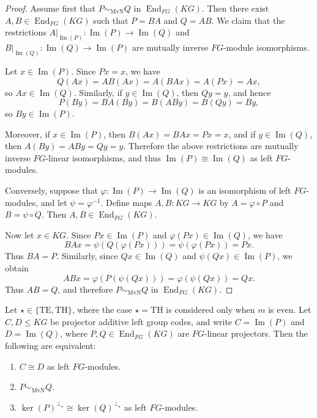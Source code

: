 \documentclass[11pt]{article}
\begin{document}
\begin{proof}
Assume first that $P\sim_{\mathrm{MvN}}Q$ in $\operatorname{End}_{FG}(KG)$. Then there exist $A,B\in \operatorname{End}_{FG}(KG)$ such that $P=BA$ and $Q=AB$. We claim that the restrictions $A|_{\operatorname{Im}(P)}:\operatorname{Im}(P)\longrightarrow\operatorname{Im}(Q)$ and $B|_{\operatorname{Im}(Q)}:\operatorname{Im}(Q)\longrightarrow\operatorname{Im}(P)$ are mutually inverse $FG$-module isomorphisms.

Let $x\in \operatorname{Im}(P)$. Since $Px=x$, we have
$$
Q(Ax)=AB(Ax)=A(BAx)=A(Px)=Ax,
$$
so $Ax\in \operatorname{Im}(Q)$. Similarly, if $y\in \operatorname{Im}(Q)$, then $Qy=y$, and hence
$$
P(By)=BA(By)=B(ABy)=B(Qy)=By,
$$
so $By\in \operatorname{Im}(P)$.

Moreover, if $x\in \operatorname{Im}(P)$, then $B(Ax)=BAx=Px=x$, and if $y\in \operatorname{Im}(Q)$, then $A(By)=ABy=Qy=y$. Therefore the above restrictions are mutually inverse $FG$-linear isomorphisms, and thus $\operatorname{Im}(P)\cong \operatorname{Im}(Q)$ as left $FG$-modules.

Conversely, suppose that $\varphi:\operatorname{Im}(P)\longrightarrow\operatorname{Im}(Q)$ is an isomorphism of left $FG$-modules, and let $\psi=\varphi^{-1}$. Define maps $A,B:KG\longrightarrow KG$ by $A=\varphi\circ P$ and $B=\psi\circ Q$. Then $A,B\in \operatorname{End}_{FG}(KG)$.

Now let $x\in KG$. Since $Px\in \operatorname{Im}(P)$ and $\varphi(Px)\in \operatorname{Im}(Q)$, we have
$$
BAx=\psi(Q(\varphi(Px)))=\psi(\varphi(Px))=Px.
$$
Thus $BA=P$. Similarly, since $Qx\in \operatorname{Im}(Q)$ and $\psi(Qx)\in \operatorname{Im}(P)$, we obtain
$$
ABx=\varphi(P(\psi(Qx)))=\varphi(\psi(Qx))=Qx.
$$
Thus $AB=Q$, and therefore $P\sim_{\mathrm{MvN}}Q$ in $\operatorname{End}_{FG}(KG)$.
\end{proof}

\begin{corollary}\label{cor:iso-neu}
Let $\star\in\{\mathrm{TE},\mathrm{TH}\}$, where the case $\star=\mathrm{TH}$ is considered only when $m$ is even. Let $C,D\leq KG$ be projector additive left group codes, and write $C=\operatorname{Im}(P)$ and $D=\operatorname{Im}(Q)$, where $P,Q\in \operatorname{End}_{FG}(KG)$ are $FG$-linear projectors. Then the following are equivalent:
\begin{enumerate}
    \item $C\cong D$ as left $FG$-modules.
    \item $P\sim_{\mathrm{MvN}}Q$.
    \item $\ker(P)^{\perp_\star}\cong \ker(Q)^{\perp_\star}$ as left $FG$-modules.
\end{enumerate}
\end{corollary}
\end{document}
